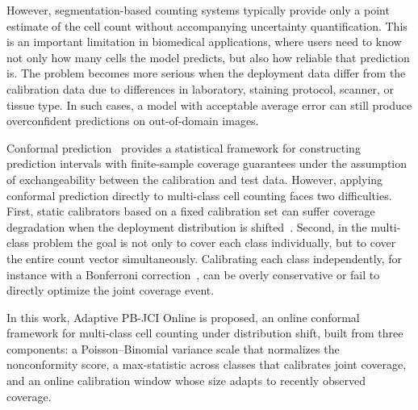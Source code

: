 \documentclass[smallextended,natbib]{svjour3}
\begin{document}
However, segmentation-based counting systems typically provide only a point
estimate of the cell count without accompanying uncertainty quantification. This
is an important limitation in biomedical applications, where users need to know
not only how many cells the model predicts, but also how reliable that prediction
is. The problem becomes more serious when the deployment data differ from the
calibration data due to differences in laboratory, staining protocol, scanner, or
tissue type. In such cases, a model with acceptable average error can still
produce overconfident predictions on out-of-domain images.

Conformal prediction~\citep{vovk2005algorithmic, angelopoulos2023gentle} provides
a statistical framework for constructing prediction intervals with finite-sample
coverage guarantees under the assumption of exchangeability between the
calibration and test data. However, applying conformal prediction directly to
multi-class cell counting faces two difficulties. First, static calibrators based
on a fixed calibration set can suffer coverage degradation when the deployment
distribution is shifted~\citep{barber2023conformal, gibbs2021adaptive}. Second, in
the multi-class problem the goal is not only to cover each class individually, but
to cover the entire count vector simultaneously. Calibrating each class
independently, for instance with a Bonferroni
correction~\citep{dunn1961multiple}, can be overly conservative or fail to
directly optimize the joint coverage event.

In this work, Adaptive PB-JCI Online is proposed, an online conformal framework for
multi-class cell counting under distribution shift, built from three components: a
Poisson--Binomial variance scale that normalizes the nonconformity score, a
max-statistic across classes that calibrates joint coverage, and an online
calibration window whose size adapts to recently observed coverage.
\end{document}
